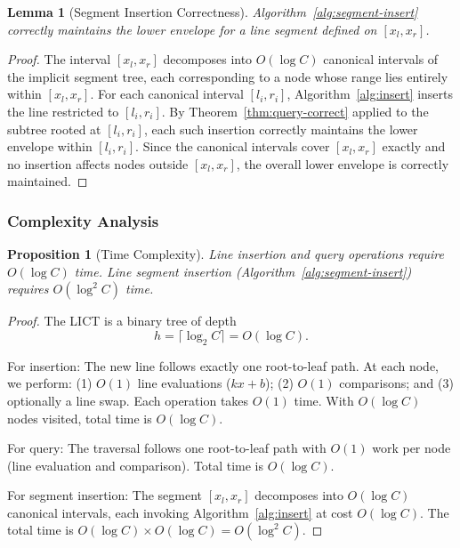 \documentclass[11pt,a4paper]{article}
\theoremstyle{definition}
\theoremstyle{plain}
\newtheorem{lemma}{Lemma}
\newtheorem{proposition}{Proposition}
\begin{document}
\begin{lemma}[Segment Insertion Correctness]\label{lem:segment-correct}
Algorithm~\ref{alg:segment-insert} correctly maintains the lower envelope for a line segment defined on $[x_l, x_r]$.
\end{lemma}

\begin{proof}
The interval $[x_l, x_r]$ decomposes into $O(\log C)$ canonical intervals of the implicit segment tree, each corresponding to a node whose range lies entirely within $[x_l, x_r]$. For each canonical interval $[l_i, r_i]$, Algorithm~\ref{alg:insert} inserts the line restricted to $[l_i, r_i]$. By Theorem~\ref{thm:query-correct} applied to the subtree rooted at $[l_i, r_i]$, each such insertion correctly maintains the lower envelope within $[l_i, r_i]$. Since the canonical intervals cover $[x_l, x_r]$ exactly and no insertion affects nodes outside $[x_l, x_r]$, the overall lower envelope is correctly maintained.
\end{proof}

\subsubsection{Complexity Analysis}

\begin{proposition}[Time Complexity]\label{prop:time-complexity}
Line insertion and query operations require $O(\log C)$ time. Line segment insertion (Algorithm~\ref{alg:segment-insert}) requires $O(\log^2 C)$ time.
\end{proposition}

\begin{proof}
The LICT is a binary tree of depth
\[
h = \lceil \log_2 C \rceil = O(\log C).
\]

For insertion: The new line follows exactly one root-to-leaf path. At each node, we perform: (1) $O(1)$ line evaluations ($kx + b$); (2) $O(1)$ comparisons; and (3) optionally a line swap. Each operation takes $O(1)$ time. With $O(\log C)$ nodes visited, total time is $O(\log C)$.

For query: The traversal follows one root-to-leaf path with $O(1)$ work per node (line evaluation and comparison). Total time is $O(\log C)$.

For segment insertion: The segment $[x_l, x_r]$ decomposes into $O(\log C)$ canonical intervals, each invoking Algorithm~\ref{alg:insert} at cost $O(\log C)$. The total time is $O(\log C) \times O(\log C) = O(\log^2 C)$.
\end{proof}
\end{document}
